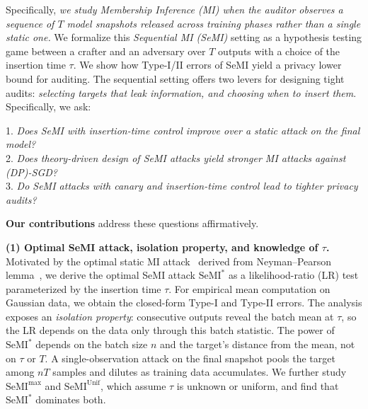 \documentclass{article}
\theoremstyle{plain}
\theoremstyle{definition}
\theoremstyle{remark}
\newcommand{\SeMIstar}{\mathrm{SeMI}^{\ast}}
\newcommand{\SeMIunif}{\mathrm{SeMI}^{\mathrm{Unif}}}
\newcommand{\SeMImax}{\mathrm{SeMI}^{\max}}
\begin{document}
Specifically, \textit{we study Membership Inference (MI) when the auditor observes a sequence of $T$ model snapshots released across training phases rather than a single static one.} We formalize this \textit{Sequential MI (SeMI)} setting as a hypothesis testing game between a crafter and an adversary over $T$ outputs with a choice of the insertion time $\tau$. We show how Type-I/II errors of SeMI yield a privacy lower bound for auditing.
The sequential setting offers two levers for designing tight audits: \textit{selecting targets that leak information, and choosing when to insert them}. Specifically, we ask:
\vspace*{-0.5em}\begin{tcolorbox}[top=2pt,bottom=2pt,left=1pt,right=1pt]
	1. \textit{Does SeMI with insertion-time control improve over a static attack on the final model?}\\
	2. \textit{Does theory-driven design of SeMI attacks yield stronger MI attacks against (DP)-SGD?}\\
	3. \textit{Do SeMI attacks with canary and insertion-time control lead to tighter privacy audits?}
\end{tcolorbox}

\textbf{Our contributions} address these questions affirmatively.


\textbf{(1) Optimal SeMI attack, isolation property, and knowledge of $\tau$.} Motivated by the optimal static MI attack~\cite{azizeTargetsAreHarder2025} derived from Neyman--Pearson lemma~\citep{neyman1933ix}, we derive the optimal SeMI attack $\SeMIstar$ as a likelihood-ratio (LR) test parameterized by the insertion time $\tau$. For empirical mean computation on Gaussian data, we obtain the closed-form Type-I and Type-II errors. The analysis exposes an \emph{isolation property}: consecutive outputs reveal the batch mean at $\tau$, so the LR depends on the data only through this batch statistic. The power of $\SeMIstar$ depends on the batch size $n$ and the target's distance from the mean, not on $\tau$ or $T$.
A single-observation attack on the final snapshot pools the target among $nT$ samples and dilutes as training data accumulates. We further study $\SeMImax$ and $\SeMIunif$, which assume $\tau$ is unknown or uniform, and find that $\SeMIstar$ dominates both.
\end{document}
